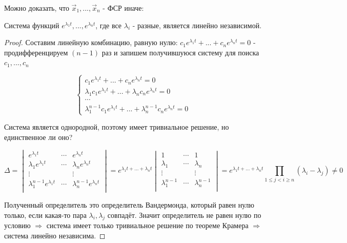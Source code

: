 Можно доказать, что $\vec{x}_1, ..., \vec{x}_n$ - ФСР иначе:
\begin{lemma}
  Система функций $e^{\lambda_1t}, ..., e^{\lambda_n t}$, где все $\lambda_i$ - разные, является линейно независимой.  
\end{lemma}
\begin{proof}
  Составим линейную комбинацию, равную нулю: $c_1 e^{\lambda_1 t} + ... + c_n e^{\lambda_n t} = 0$ - продифференцируем $(n-1)$ раз и 
  запишем получившуюся систему для поиска $c_1, ..., c_n$

  \[
  \begin{cases}
    c_1 e^{\lambda_1 t} + ... + c_n e^{\lambda_n t} = 0 \\
    \lambda_1 c_1 e^{\lambda_1 t} + ... + \lambda_n c_n e^{\lambda_n t} = 0 \\
    \cdots \\
    \lambda_1^{n-1} c_1 e^{\lambda_1 t} + ... + \lambda_n^{n-1} c_n e^{\lambda_n t} = 0
  \end{cases} 
  \]

Система является однородной, поэтому имеет тривиальное решение, но единственное ли оно? 

\[ \Delta = \begin{vmatrix*}
  e^{\lambda_1 t} & \cdots & e^{\lambda_n t} \\
  \lambda_1 e^{\lambda_1 t} & \cdots & \lambda_n e^{\lambda_n t} \\
  \vdots &  & \vdots \\ 
  \lambda_1^{n-1} e^{\lambda_1 t} & \cdots & \lambda_n^{n-1} e^{\lambda_n t} \\
\end{vmatrix*} = e^{\lambda_1 t + ... + \lambda_n t} \begin{vmatrix*}
  1 & \cdots & 1 \\
  \lambda_1  & \cdots & \lambda_n  \\
  \vdots &  & \vdots \\ 
  \lambda_1^{n-1}  & \cdots & \lambda_n^{n-1} \\
\end{vmatrix*} = e^{\lambda_1 t + ... + \lambda_n t} \prod \limits_{1 \leq j < i \geq n} (\lambda_i - \lambda_j) \neq 0
\]

Полученный определитель это определитель Вандермонда, который равен нулю только, если какая-то пара $\lambda_i, \lambda_j$ совпадёт. 
Значит определитель не равен нулю по условию $\Rightarrow$ система имеет только тривиальное решение по теореме Крамера $\Rightarrow$ система линейно независима.
\end{proof}

